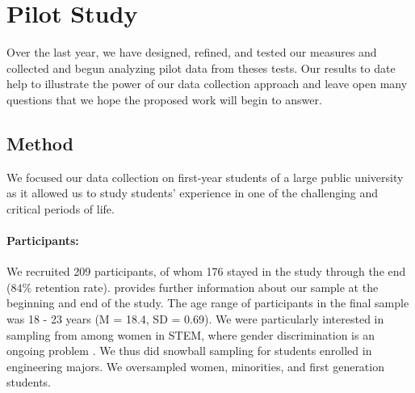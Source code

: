 \section{Pilot Study}
\label{sec:study}
\noindent Over the last year, we have designed, refined, and tested our measures and collected and begun analyzing pilot data from theses tests. Our results to date help to illustrate the power of our data collection approach and leave open many questions that we hope the proposed work will begin to answer. 

\subsection{Method}
\noindent
We focused our data collection on first-year students of a large public university as it allowed us to study students' experience in one of the challenging and critical periods of life.

\paragraph{Participants:}
\label{sec:study-participants}
We recruited 209 participants, of whom 176 stayed in the study through the end ($84\%$ retention rate).  provides further information about our sample at the beginning and end of the study. The age range of participants in the final sample was 18 - 23 years (M = 18.4, SD = 0.69).  We were particularly interested in sampling from among women in STEM, where gender discrimination is an ongoing problem \cite{johnson2018sexual}. We thus did snowball sampling for students enrolled in engineering majors. We oversampled women, minorities, and first generation students. 

